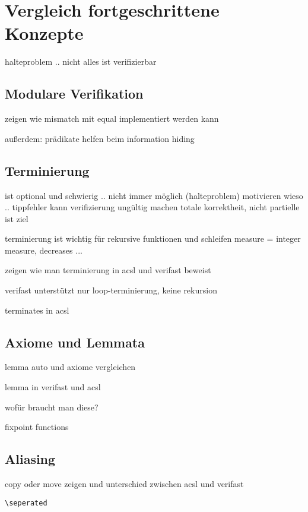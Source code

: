 ﻿
\chapter{Vergleich fortgeschrittene Konzepte}

halteproblem .. nicht alles ist verifizierbar

\section{Modulare Verifikation}

zeigen wie mismatch mit equal implementiert werden kann

außerdem: prädikate helfen beim information hiding

\section{Terminierung}

ist optional und schwierig .. nicht immer möglich (halteproblem)
motivieren wieso .. tippfehler kann verifizierung ungültig machen
totale korrektheit, nicht partielle ist ziel


terminierung ist wichtig für rekursive funktionen und schleifen
measure = integer measure, decreases ...

zeigen wie man terminierung in acsl und verifast beweist

verifast unterstützt nur loop-terminierung, keine rekursion

terminates in acsl

\section{Axiome und Lemmata}

lemma auto und axiome vergleichen

lemma in verifast und acsl

wofür braucht man diese?

fixpoint functions

\section{Aliasing}

copy oder move zeigen und unterschied zwischen acsl und verifast

\lstinline{\seperated}


